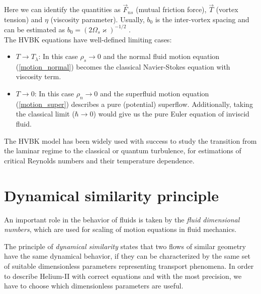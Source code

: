 Here we can identify the quantities as $\vec{F}_{ns}$ (mutual friction force), $\vec{T}$ (vortex tension) and $\eta$ (viscosity parameter). Usually, $b_0$ is the inter-vortex spacing and can be estimated as $b_0 = (2\Omega_s \varkappa)^{-1/2}$ \cite{barenghi}.\\
The HVBK equations have well-defined limiting cases:

\begin{itemize}
	\item $T \rightarrow T_{\lambda}$: In this case $\rho_s \rightarrow 0$ and the normal fluid motion equation (\ref{motion_normal}) becomes the classical Navier-Stokes equation with viscosity term.

	\item $T \rightarrow 0$: In this case $\rho_n \rightarrow 0$ and the superfluid motion equation (\ref{motion_super}) describes a pure (potential) superflow. Additionally, taking the classical limit ($\hbar \rightarrow 0$) would give us the pure Euler equation of inviscid fluid.
\end{itemize}

The HVBK model has been widely used with success to study the transition from the laminar regime to the classical or quantum turbulence, for estimations of critical Reynolds numbers and their temperature dependence.

\newpage


\section{Dynamical similarity principle}

An important role in the behavior of fluids is taken by the \textit{fluid dimensional numbers}, which are used for scaling of motion equations in fluid mechanics.

The principle of \textit{dynamical similarity} states that two flows of similar geometry have the same dynamical behavior, if they can be characterized by the same set of suitable dimensionless parameters representing transport phenomena. In order to describe Helium-II with correct equations and with the most precision, we have to choose which dimensionless parameters are useful.

